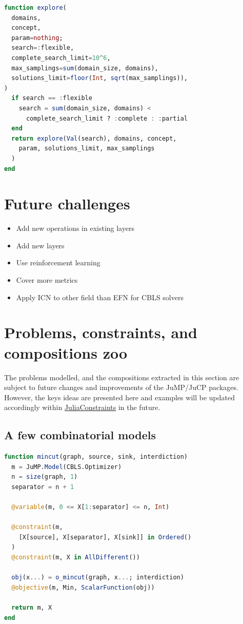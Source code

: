 \documentclass{juliacon}
\newcommand{\jc}{\href{https://github.com/JuliaConstraints}{JuliaConstraints}\xspace}
\begin{document}
\begin{lstlisting}[language = Julia]
function explore(
  domains,
  concept,
  param=nothing;
  search=:flexible,
  complete_search_limit=10^6,
  max_samplings=sum(domain_size, domains),
  solutions_limit=floor(Int, sqrt(max_samplings)),
)
  if search == :flexible
    search = sum(domain_size, domains) <
      complete_search_limit ? :complete : :partial
  end
  return explore(Val(search), domains, concept,
    param, solutions_limit, max_samplings
  )
end
\end{lstlisting}



\section{Future challenges}
\label{sec:future}

\begin{itemize}
  \item Add new operations in existing layers
  \item Add new layers
  \item Use reinforcement learning
  \item Cover more metrics
  \item Apply ICN to other field than EFN for CBLS solvers
\end{itemize}

\section{Problems, constraints, and compositions zoo}
\label{sec:zoo}

The problems modelled, and the compositions extracted in this section are subject to future changes and improvements of the JuMP/JuCP packages. However, the keys ideas are presented here and examples will be updated accordingly within \jc in the future.

\subsection{A few combinatorial models}
\label{subsec:models}

\begin{lstlisting}[language = Julia]
function mincut(graph, source, sink, interdiction)
  m = JuMP.Model(CBLS.Optimizer)
  n = size(graph, 1)
  separator = n + 1

  @variable(m, 0 <= X[1:separator] <= n, Int)

  @constraint(m,
    [X[source], X[separator], X[sink]] in Ordered()
  )
  @constraint(m, X in AllDifferent())

  obj(x...) = o_mincut(graph, x...; interdiction)
  @objective(m, Min, ScalarFunction(obj))

  return m, X
end
\end{lstlisting}
\end{document}
